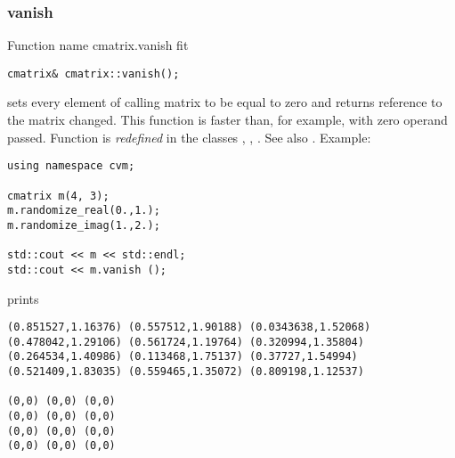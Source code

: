 \subsubsection{vanish}
Function%
\pdfdest name {cmatrix.vanish} fit
\begin{verbatim}
cmatrix& cmatrix::vanish();
\end{verbatim}
sets every element of  calling matrix to be equal to zero
and returns  reference to
the matrix changed. This function is faster
than, for example,
with zero operand passed.
Function is \emph{redefined} in the classes
, ,
.
See also .
Example:
\begin{Verbatim}
using namespace cvm;

cmatrix m(4, 3);
m.randomize_real(0.,1.);
m.randomize_imag(1.,2.);

std::cout << m << std::endl;
std::cout << m.vanish ();
\end{Verbatim}
prints
\begin{Verbatim}
(0.851527,1.16376) (0.557512,1.90188) (0.0343638,1.52068)
(0.478042,1.29106) (0.561724,1.19764) (0.320994,1.35804)
(0.264534,1.40986) (0.113468,1.75137) (0.37727,1.54994)
(0.521409,1.83035) (0.559465,1.35072) (0.809198,1.12537)

(0,0) (0,0) (0,0)
(0,0) (0,0) (0,0)
(0,0) (0,0) (0,0)
(0,0) (0,0) (0,0)
\end{Verbatim}
\newpage



